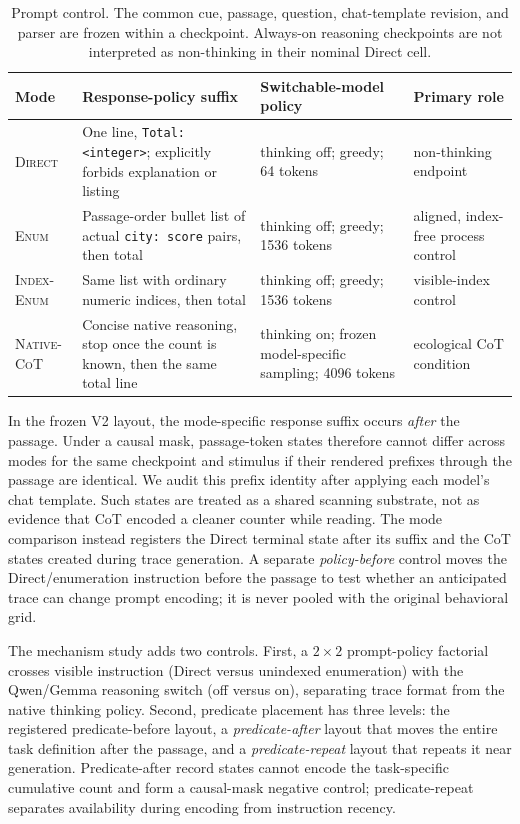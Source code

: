 \documentclass[10pt,twocolumn]{article}
\newcommand{\direct}{\textsc{Direct}\xspace}
\newcommand{\enumplain}{\textsc{Enum}\xspace}
\newcommand{\enumindex}{\textsc{Index-Enum}\xspace}
\newcommand{\native}{\textsc{Native-CoT}\xspace}
\begin{document}
\begin{table}[t]
\centering
\small
\begin{tabularx}{\textwidth}{p{}p{}p{}Y}
\toprule
Mode & Response-policy suffix & Switchable-model policy & Primary role \\
\midrule
\direct & One line, \texttt{Total: <integer>}; explicitly forbids explanation or listing &
thinking off; greedy; 64 tokens & non-thinking endpoint \\
\enumplain & Passage-order bullet list of actual \texttt{city: score} pairs, then total &
thinking off; greedy; 1536 tokens & aligned, index-free process control \\
\enumindex & Same list with ordinary numeric indices, then total &
thinking off; greedy; 1536 tokens & visible-index control \\
\native & Concise native reasoning, stop once the count is known, then the same total line &
thinking on; frozen model-specific sampling; 4096 tokens & ecological CoT condition \\
\bottomrule
\end{tabularx}
\caption{Prompt control. The common cue, passage, question, chat-template revision, and parser
are frozen within a checkpoint. Always-on reasoning checkpoints are not interpreted as
non-thinking in their nominal Direct cell.}
\label{tab:prompt-modes}
\end{table}

In the frozen V2 layout, the mode-specific response suffix occurs \emph{after} the passage.
Under a causal mask, passage-token states therefore cannot differ across modes for the same
checkpoint and stimulus if their rendered prefixes through the passage are identical. We audit
this prefix identity after applying each model's chat template. Such states are treated as a
shared scanning substrate, not as evidence that CoT encoded a cleaner counter while reading.
The mode comparison instead registers the Direct terminal state after its suffix and the CoT
states created during trace generation. A separate \emph{policy-before} control moves the
Direct/enumeration instruction before the passage to test whether an anticipated trace can
change prompt encoding; it is never pooled with the original behavioral grid.

The mechanism study adds two controls. First, a $2\times2$ prompt-policy factorial crosses
visible instruction (Direct versus unindexed enumeration) with the Qwen/Gemma reasoning switch
(off versus on), separating trace format from the native thinking policy. Second, predicate
placement has three levels: the registered predicate-before layout, a \emph{predicate-after}
layout that moves the entire task definition after the passage, and a
\emph{predicate-repeat} layout that repeats it near generation. Predicate-after record states
cannot encode the task-specific cumulative count and form a causal-mask negative control;
predicate-repeat separates availability during encoding from instruction recency.
\end{document}
